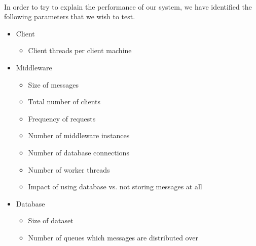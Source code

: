 \documentclass{article}
\begin{document}
        \\
        In order to try to explain the performance of our system, we have identified the following parameters that we wish to test.
        \begin{itemize}
            \item Client
            \begin{itemize}
                \item Client threads per client machine
            \end{itemize}
            \item Middleware
            \begin{itemize}
                \item Size of messages
                \item Total number of clients
                \item Frequency of requests
                \item Number of middleware instances
                \item Number of database connections
                \item Number of worker threads
                \item Impact of using database vs. not storing messages at all
            \end{itemize}
            \item Database
            \begin{itemize}
                \item Size of dataset
                \item Number of queues which messages are distributed over
            \end{itemize}
        \end{itemize}
\end{document}
